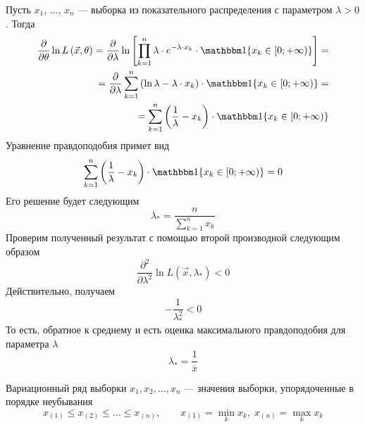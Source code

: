 \begin{example}
  Пусть $x_1$, $\dots$, $x_n$ --- выборка из показательного распределения с
  параметром $\lambda > 0$.
  Тогда
  \begin{align*}
    \frac{\partial}{\partial\theta} \ln{L\left( \vec{x}, \theta \right)} =
    \frac{\partial}{\partial \lambda} \ln{\left[ \prod_{k=1}^n \lambda
      \cdot e^{- \lambda \cdot x_k}
      \cdot \Indicator{x_k \in \left[ 0; +\infty \right)} \right]} = \\
    = \frac{\partial}{\partial \lambda} \sum_{k=1}^{n} \left( \ln{\lambda}
        - \lambda \cdot x_k \right)
      \cdot \Indicator{x_k \in \left[ 0; +\infty \right)} = \\
    = \sum_{k=1}^{n} \left( \frac{1}{\lambda} - x_k \right)
      \cdot \Indicator{x_k \in \left[ 0; +\infty \right)}
  \end{align*}
  Уравнение правдоподобия примет вид
  \begin{equation*}
    \sum_{k=1}^{n} \left( \frac{1}{\lambda} - x_k \right)
      \cdot \Indicator{x_k \in \left[ 0; +\infty \right)} = 0
  \end{equation*}
  Его решение будет следующим
  \begin{equation*}
    \lambda_* = \frac{n}{\sum_{k=1}^{n} x_k}
  \end{equation*}
  Проверим полученный результат с помощью второй производной следующим образом
  \begin{equation*}
    \frac{\partial^2}{\partial \lambda^2}
    \ln{L\left( \vec{x}, \lambda_* \right)} < 0
  \end{equation*}
  Действительно, получаем
  \begin{equation*}
    -\frac{1}{\lambda_*^2} < 0
  \end{equation*}
  То есть, обратное к среднему и есть оценка максимального правдоподобия для
  параметра $\lambda$
  \begin{equation*}
    \lambda_* = \frac{1}{\overline{x}}
  \end{equation*}
\end{example}

\begin{definition}
  Вариационный ряд выборки $x_1, x_2, \dots, x_n$ --- значения выборки,
  упорядоченные в порядке неубывания
  \begin{equation*}
    x_{\left(1\right)} \le x_{\left(2\right)} \le \dots
      \le x_{\left(n\right)},\qquad
    x_{\left(1\right)}=\underset{k}\min{x_k},\;
    x_{\left(n\right)}=\underset{k}\max{x_k}
  \end{equation*}
\end{definition}

